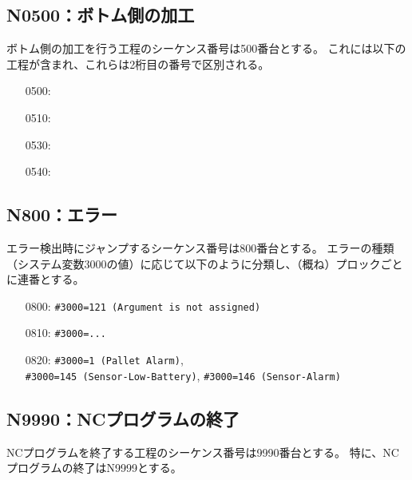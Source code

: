 \clearpage
\subsection{N0500：ボトム側の加工}
ボトム側の加工を行う工程のシーケンス番号は500番台とする。
これには以下の工程が含まれ、これらは2桁目の番号で区別される。
\begin{enumerate}
\item[0500:] \BottomEndFacecutMilling
\item[0510:] \BottomOutcutMilling
\item[0530:] \BottomEndFaceOutCChamferMilling
\item[0540:] \BottomEndFaceInCChamferMilling
\end{enumerate}


\subsection{N800：エラー\label{subsec:sequenceNerror}\vphantom{\ref{subsec:sequenceNerror}}\TBW}
エラー検出時にジャンプするシーケンス番号は800番台とする。
エラーの種類（システム変数\ttNum3000の値）に応じて以下のように分類し、（概ね）プロックごとに連番とする。
\begin{enumerate}
\item[0800:] \verb|#3000=121 (Argument is not assigned)|
\item[0810:] \verb|#3000=...|
\item[0820:] \verb|#3000=1 (Pallet Alarm)|,\\
            \verb|#3000=145 (Sensor-Low-Battery)|, \verb|#3000=146 (Sensor-Alarm)|
\end{enumerate}


\subsection{N9990：NCプログラムの終了\label{subsec:sequenceNprgEnd}}
NCプログラムを終了する工程のシーケンス番号は9990番台とする。
特に、NCプログラムの終了はN9999とする。



